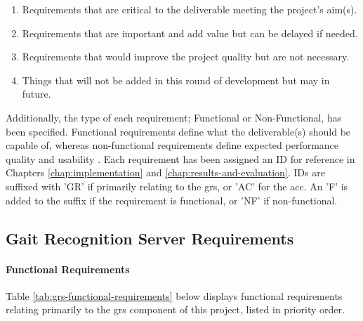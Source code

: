 \begin{enumerate}
    \item \textbf{} Requirements that are critical to the deliverable meeting the project's aim(s).
    \item \textbf{} Requirements that are important and add value but can be delayed if needed.
    \item \textbf{} Requirements that would improve the project quality but are not necessary.
    \item \textbf{} Things that will not be added in this round of development but may in future.
\end{enumerate}

Additionally, the type of each requirement;
Functional or Non-Functional, has been specified.
Functional requirements define what the deliverable(s) should be capable of, whereas non-functional requirements define expected performance quality and usability \parencite{brennanGuideBusinessAnalysis2009}.
Each requirement has been assigned an ID for reference in Chapters \ref{chap:implementation} and \ref{chap:results-and-evaluation}.
IDs are suffixed with 'GR' if primarily relating to the \ac{grs}, or 'AC' for the \ac{acc}.
An 'F' is added to the suffix if the requirement is functional, or 'NF' if non-functional.

\subsection{Gait Recognition Server Requirements}
\label{subsec:grs-requirements}

\paragraph{Functional Requirements} Table \ref{tab:grs-functional-requirements} below displays functional requirements relating primarily to the \ac{grs} component of this project, listed in priority order.

